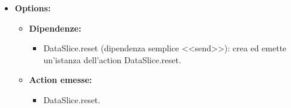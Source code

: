 \begin{itemize}
      \item \textbf{Options:}
            \begin{itemize}
                  \item \textbf{Dipendenze:}
                        \begin{itemize}
                              \item DataSlice.reset (dipendenza semplice <<send>>): crea ed emette un'istanza
                                    dell'action DataSlice.reset.
                        \end{itemize}
                  \item \textbf{Action emesse:}
                        \begin{itemize}
                              \item DataSlice.reset.
                        \end{itemize}
            \end{itemize}
\end{itemize}

\pagebreak

